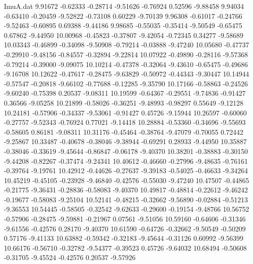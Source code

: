 \begin{filecontents}{ImuA.dat}
   9.91672   -0.62333   -0.28714   -9.51626   -0.76924    0.52596   -9.88458
   9.94034   -0.63410   -0.20459   -9.52822   -0.73108    0.60229   -9.70139
   9.96308   -0.61017   -0.24766   -9.52463   -0.60895    0.69388   -9.44186
   9.98685   -0.55035   -0.35414   -9.50549   -0.65475    0.67862   -9.44950
  10.00968   -0.45823   -0.37807   -9.42054   -0.72345    0.34277   -9.58689
  10.03343   -0.46899   -0.34098   -9.50908   -0.79214   -0.03888   -9.47240
  10.05680   -0.47737   -0.29910   -9.48156   -0.84557   -0.32894   -9.22814
  10.07922   -0.49890   -0.28116   -9.57368   -0.79214   -0.39000   -9.09075
  10.10214   -0.47378   -0.32064   -9.43610   -0.65475   -0.49686   -9.16708
  10.12622   -0.47617   -0.28475   -9.63829   -0.50972   -0.44343   -9.30447
  10.14944   -0.57547   -0.20818   -9.66102   -0.77688   -0.12285   -9.35790
  10.17166   -0.58863   -0.24526   -9.60240   -0.75398    0.20537   -9.08311
  10.19599   -0.64367   -0.29551   -9.74836   -0.91427    0.36566   -9.05258
  10.21899   -0.58026   -0.36251   -9.48993   -0.98297    0.55649   -9.12128
  10.24181   -0.57906   -0.34337   -9.53061   -0.91427    0.45726   -9.15944
  10.26597   -0.60060   -0.27757   -9.52343   -0.76924    0.77021   -9.14418
  10.28884   -0.53360   -0.34696   -9.55693   -0.58605    0.86181   -9.08311
  10.31176   -0.45464   -0.38764   -9.47079   -0.70055    0.72442   -9.25867
  10.33487   -0.40678   -0.38046   -9.38944   -0.69291    0.28933   -9.44950
  10.35887   -0.38046   -0.33619   -9.45644   -0.86847   -0.06178   -9.40370
  10.38201   -0.38883   -0.30150   -9.44208   -0.82267   -0.37474   -9.24341
  10.40612   -0.46660   -0.27996   -9.48635   -0.76161   -0.39764   -9.19761
  10.42912   -0.44626   -0.27637   -9.39183   -0.54025   -0.46633   -9.34264
  10.45219   -0.45105   -0.23928   -9.46840   -0.42576   -0.55030   -9.47240
  10.47507   -0.44865   -0.21775   -9.36431   -0.28836   -0.58083   -9.40370
  10.49817   -0.48814   -0.22612   -9.46242   -0.19677   -0.58083   -9.25104
  10.52141   -0.48215   -0.32662   -9.56890   -0.02884   -0.51213   -9.36553
  10.54445   -0.58505   -0.32542   -9.62633   -0.29600   -0.19154   -9.48766
  10.56752   -0.57906   -0.28475   -9.59881   -0.21967    0.07561   -9.51056
  10.59160   -0.64606   -0.31346   -9.61556   -0.42576    0.28170   -9.40370
  10.61590   -0.64726   -0.32662   -9.50549   -0.50209    0.57176   -9.41133
  10.63882   -0.59342   -0.32183   -9.45644   -0.31126    0.60992   -9.56399
  10.66176   -0.56710   -0.32782   -9.54377   -0.39523    0.45726   -9.64032
  10.68494   -0.50608   -0.31705   -9.45524   -0.42576    0.20537   -9.57926

\end{filecontents}
